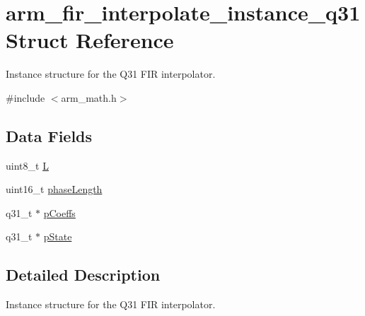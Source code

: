 \hypertarget{structarm__fir__interpolate__instance__q31}{\section{arm\-\_\-fir\-\_\-interpolate\-\_\-instance\-\_\-q31 Struct Reference}
\label{structarm__fir__interpolate__instance__q31}
}


Instance structure for the Q31 F\-I\-R interpolator.  




{\ttfamily \#include $<$arm\-\_\-math.\-h$>$}

\subsection*{Data Fields}
\begin{DoxyCompactItemize}
\item 
uint8\-\_\-t \hyperlink{structarm__fir__interpolate__instance__q31_aee73cc056696e504430c53eaa9c58cf0}{L}
\item 
uint16\-\_\-t \hyperlink{structarm__fir__interpolate__instance__q31_a8f92bb07e0812f94679438cdf412b26a}{phase\-Length}
\item 
q31\-\_\-t $\ast$ \hyperlink{structarm__fir__interpolate__instance__q31_a68888e36167d81cb7836db10367a1682}{p\-Coeffs}
\item 
q31\-\_\-t $\ast$ \hyperlink{structarm__fir__interpolate__instance__q31_adee4ba3ee8869865af7d8fa08ca913d6}{p\-State}
\end{DoxyCompactItemize}


\subsection{Detailed Description}
Instance structure for the Q31 F\-I\-R interpolator. 

